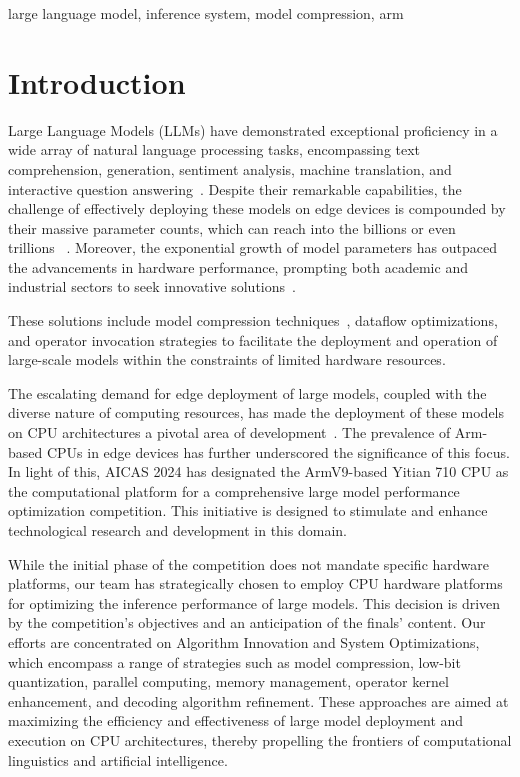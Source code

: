 \documentclass[conference]{IEEEtran}
\begin{document}
\begin{IEEEkeywords}
large language model, inference system, model compression, arm
\end{IEEEkeywords}

\section{Introduction}
Large Language Models (LLMs) have demonstrated exceptional proficiency in a wide array of natural language processing tasks, encompassing text comprehension, generation, sentiment analysis, machine translation, and interactive question answering~\cite{miao2023towards,touvron2023llama,code_llama_Rozière_Gehring_Gloeckle_Sootla_Gat_Tan_Adi_Liu_Remez_Rapin_et,qwen_1_8_bai2023qwen,zhang2022opt}. Despite their remarkable capabilities, the challenge of effectively deploying these models on edge devices is compounded by their massive parameter counts, which can reach into the billions or even trillions~
\cite{li2024transformer_lite}. Moreover, the exponential growth of model parameters has outpaced the advancements in hardware performance, prompting both academic and industrial sectors to seek innovative solutions~\cite{miao2023towards,alizadeh2023llm_flash}.

These solutions include model compression techniques~\cite{shortgpt_Men_Xu_Zhang_Wang_Lin_Lu_Han_Chen,slicegpt_ashkboos2024slicegpt}, dataflow optimizations, and operator invocation strategies to facilitate the deployment and operation of large-scale models within the constraints of limited hardware resources.

The escalating demand for edge deployment of large models, coupled with the diverse nature of computing resources, has made the deployment of these models on CPU architectures a pivotal area of development~\cite{arm_cpu_llms,intel_cpu_Shen_Chang_Dong_Luo_Meng_2023,li2024transformer_lite}. The prevalence of Arm-based CPUs in edge devices has further underscored the significance of this focus. In light of this,  AICAS 2024 has designated the ArmV9-based Yitian 710 CPU as the computational platform for a comprehensive large model performance optimization competition. This initiative is designed to stimulate and enhance technological research and development in this domain.

While the initial phase of the competition does not mandate specific hardware platforms, our team has strategically chosen to employ CPU hardware platforms for optimizing the inference performance of large models. This decision is driven by the competition's objectives and an anticipation of the finals' content. Our efforts are concentrated on Algorithm Innovation and System Optimizations, which encompass a range of strategies such as model compression, low-bit quantization, parallel computing, memory management, operator kernel enhancement, and decoding algorithm refinement. These approaches are aimed at maximizing the efficiency and effectiveness of large model deployment and execution on CPU architectures, thereby propelling the frontiers of computational linguistics and artificial intelligence.
\end{document}

